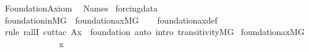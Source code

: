 %
\begin{isabellebody}%
%
%
\isadelimdocument
%
\endisadelimdocument
%
\isatagdocument
%
\isamarkuptrue%
%
\endisatagdocument
{\isafolddocument}%
%
\isadelimdocument
%
\endisadelimdocument
%
\isadelimtheory
%
\endisadelimtheory
%
\isatagtheory
{}\isamarkupfalse%
\ Foundation{\isacharunderscore}{\kern0pt}Axiom\isanewline
{}\isanewline
\ \ Names\isanewline
{}%
\endisatagtheory
{\isafoldtheory}%
%
\isadelimtheory
\isanewline
%
\endisadelimtheory
\isanewline
{}\isamarkupfalse%
\ forcing{\isacharunderscore}{\kern0pt}data\isanewline
{}\isanewline
\ \ \isanewline
\ \ \isanewline
{}\isamarkupfalse%
\ foundation{\isacharunderscore}{\kern0pt}in{\isacharunderscore}{\kern0pt}MG\ {\isacharcolon}{\kern0pt}\ {\isachardoublequoteopen}foundation{\isacharunderscore}{\kern0pt}ax{\isacharparenleft}{\kern0pt}{\isacharhash}{\kern0pt}{\isacharhash}{\kern0pt}{\isacharparenleft}{\kern0pt}M{\isacharbrackleft}{\kern0pt}G{\isacharbrackright}{\kern0pt}{\isacharparenright}{\kern0pt}{\isacharparenright}{\kern0pt}{\isachardoublequoteclose}\isanewline
%
\isadelimproof
\ \ %
\endisadelimproof
%
\isatagproof
{}\isamarkupfalse%
\ foundation{\isacharunderscore}{\kern0pt}ax{\isacharunderscore}{\kern0pt}def\isanewline
\ \ \isamarkupfalse%
\ {\isacharparenleft}{\kern0pt}rule\ rallI{\isacharcomma}{\kern0pt}\ cut{\isacharunderscore}{\kern0pt}tac\ A{\isacharequal}{\kern0pt}x\ \ foundation{\isacharcomma}{\kern0pt}\ auto\ intro{\isacharcolon}{\kern0pt}\ transitivity{\isacharunderscore}{\kern0pt}MG{\isacharparenright}{\kern0pt}%
\endisatagproof
{\isafoldproof}%
%
\isadelimproof
\isanewline
%
\endisadelimproof
\isanewline
\isanewline
{}\isamarkupfalse%
\ {\isachardoublequoteopen}foundation{\isacharunderscore}{\kern0pt}ax{\isacharparenleft}{\kern0pt}{\isacharhash}{\kern0pt}{\isacharhash}{\kern0pt}{\isacharparenleft}{\kern0pt}M{\isacharbrackleft}{\kern0pt}G{\isacharbrackright}{\kern0pt}{\isacharparenright}{\kern0pt}{\isacharparenright}{\kern0pt}{\isachardoublequoteclose}\isanewline
%
\isadelimproof
%
\endisadelimproof
%
\isatagproof
{}\isamarkupfalse%
\ {\isacharminus}{\kern0pt}\isanewline
\ \ \isacommand{{\isacharbraceleft}{\kern0pt}}\isamarkupfalse%
\ \ \ \isanewline
\ \ \ \ \isamarkupfalse%
\ x\ \isanewline
\ \ \ \ \isamarkupfalse%

\end{isabellebody}
